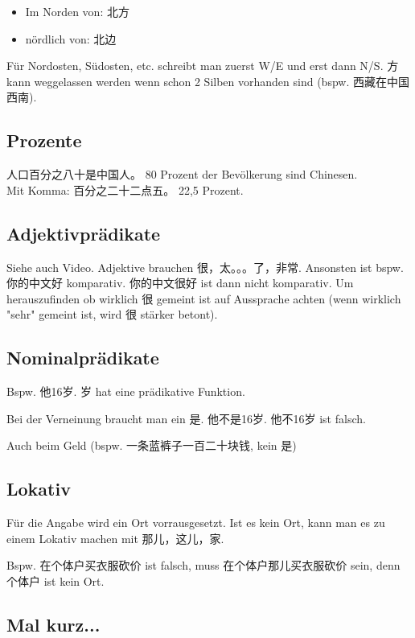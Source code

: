 \documentclass[UTF8]{ctexart}
\begin{document}
\begin{itemize}
    \item Im Norden von: 北方
    \item nördlich von: 北边
\end{itemize}

Für Nordosten, Südosten, etc. schreibt man zuerst W/E und erst dann N/S. 方 kann weggelassen werden wenn schon 2 Silben vorhanden sind (bspw. 西藏在中国西南).

\subsection{Prozente}

人口百分之八十是中国人。 80 Prozent der Bevölkerung sind Chinesen.\\
Mit Komma: 百分之二十二点五。 22,5 Prozent.

\subsection{Adjektivprädikate}

Siehe auch Video. Adjektive brauchen 很，太。。。了，非常. Ansonsten ist bspw. 你的中文好 komparativ. 你的中文很好 ist dann nicht komparativ. Um herauszufinden ob wirklich 很 gemeint ist auf Aussprache achten (wenn wirklich "sehr" gemeint ist, wird 很 stärker betont).

\subsection{Nominalprädikate}

Bspw. 他16岁. 岁 hat eine prädikative Funktion.

Bei der Verneinung braucht man ein 是. 他不是16岁. 他不16岁 ist falsch.

Auch beim Geld (bspw. 一条蓝裤子一百二十块钱, kein 是)

\subsection{Lokativ}

Für die Angabe wird ein Ort vorrausgesetzt. Ist es kein Ort, kann man es zu einem Lokativ machen mit 那儿，这儿，家.

Bspw. 在个体户买衣服砍价 ist falsch, muss 在个体户那儿买衣服砍价 sein, denn 个体户 ist kein Ort.\\

\subsection{Mal kurz...}
\end{document}

